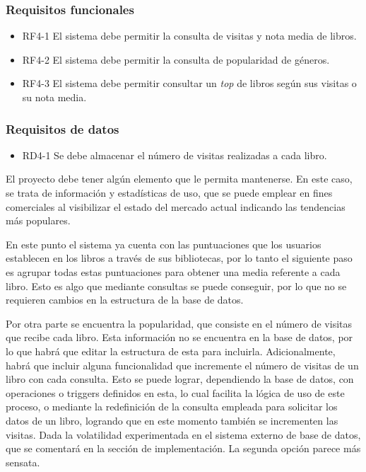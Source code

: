 \subsubsection{Requisitos funcionales}
\begin{itemize}
    \item RF4-1 El sistema debe permitir la consulta de visitas y nota media de libros.
    \item RF4-2 El sistema debe permitir la consulta de popularidad de géneros.
    \item RF4-3 El sistema debe permitir consultar un \textit{top} de libros según sus visitas o su nota media.
\end{itemize}

\subsubsection{Requisitos de datos}
\begin{itemize}
    \item RD4-1 Se debe almacenar el número de visitas realizadas a cada libro.
\end{itemize}

El proyecto debe tener algún elemento que le permita mantenerse. En este caso, se trata de información y estadísticas de uso, que se puede emplear en fines comerciales al visibilizar el estado del mercado actual indicando las tendencias más populares.

En este punto el sistema ya cuenta con las puntuaciones que los usuarios establecen en los libros a través de sus bibliotecas, por lo tanto el siguiente paso es agrupar todas estas puntuaciones para obtener una media referente a cada libro. Esto es algo que mediante consultas se puede conseguir, por lo que no se requieren cambios en la estructura de la base de datos.

Por otra parte se encuentra la popularidad, que consiste en el número de visitas que recibe cada libro. Esta información no se encuentra en la base de datos, por lo que habrá que editar la estructura de esta para incluirla. Adicionalmente, habrá que incluir alguna funcionalidad que incremente el número de visitas de un libro con cada consulta. Esto se puede lograr, dependiendo la base de datos, con operaciones o triggers definidos en esta, lo cual facilita la lógica de uso de este proceso, o mediante la redefinición de la consulta empleada para solicitar los datos de un libro, logrando que en este momento también se incrementen las visitas. Dada la volatilidad experimentada en el sistema externo de base de datos, que se comentará en la sección de implementación. La segunda opción parece más sensata.

